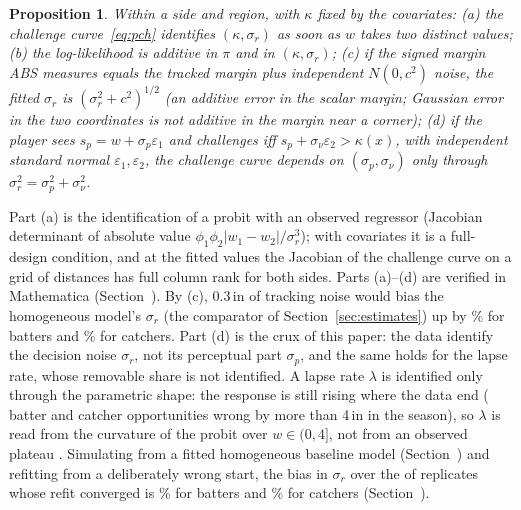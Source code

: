 \documentclass[aoas]{imsart}
\theoremstyle{plain}
\newtheorem{proposition}[theorem]{Proposition}
\theoremstyle{definition}
\begin{document}
\begin{proposition}\label{prop:ident}
Within a side and region, with $\kappa$ fixed by the covariates: (a) the challenge curve~\eqref{eq:pch} identifies
$(\kappa,\sigma_r)$ as soon as $w$ takes two distinct values; (b) the log-likelihood is additive in $\pi$ and in
$(\kappa,\sigma_r)$; (c) if the signed margin ABS measures equals the tracked margin plus independent $N(0,c^2)$ noise, the
fitted $\sigma_r$ is $(\sigma_r^2+c^2)^{1/2}$ (an additive error in the scalar margin; Gaussian error in the two
coordinates is not additive in the margin near a corner); (d) if the player sees $s_p=w+\sigma_p\varepsilon_1$ and challenges iff
$s_p+\sigma_\nu\varepsilon_2>\kappa(x)$, with independent standard normal $\varepsilon_1,\varepsilon_2$, the challenge
curve depends on $(\sigma_p,\sigma_\nu)$ only through $\sigma_r^2=\sigma_p^2+\sigma_\nu^2$.
\end{proposition}
\noindent Part (a) is the identification of a probit with an observed regressor (Jacobian determinant of absolute value
$\phi_1\phi_2|w_1-w_2|/\sigma_r^3$); with covariates it is a full-design condition, and at the fitted values the
Jacobian of the challenge curve on a grid of distances has full column rank for both sides. Parts (a)--(d) are verified in Mathematica
(Section~). By (c), $0.3$\,in of tracking noise would bias the homogeneous model's $\sigma_r$ (the comparator of
Section~\ref{sec:estimates}) up by \DetCoordBiasBatter\% for
batters and \DetCoordBiasCatcher\% for catchers. Part (d) is the crux of this paper: the data identify the decision
noise $\sigma_r$, not its perceptual part $\sigma_p$, and the same holds for the lapse rate, whose removable share is
not identified. A lapse rate $\lambda$ is identified only through the parametric shape: the response is still rising
where the data end (\TailFourBatter{} batter and \TailFourCatcher{} catcher opportunities wrong by more than 4\,in in the
season), so $\lambda$ is read from the curvature of the probit over $w\in(0,4]$, not from an observed plateau
\citep{Prins2012}. Simulating from a fitted homogeneous baseline model (Section~) and refitting from a deliberately wrong start, the bias in $\sigma_r$ over the \RecovConv{} of \RecovN{} replicates whose refit converged is \RecovBiasBatter\% for batters and \RecovBiasCatcher\% for catchers
(Section~).
\end{document}
